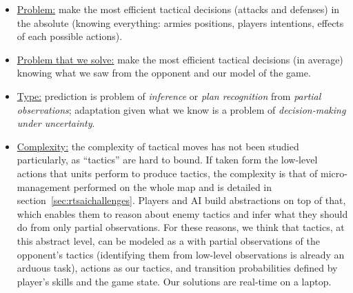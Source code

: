 \begin{itemize}
\item \underline{Problem:} make the most efficient tactical decisions (attacks and defenses) in the absolute (knowing everything: armies positions, players intentions, effects of each possible actions).
\item \underline{Problem that we solve:} make the most efficient tactical decisions (in average) knowing what we saw from the opponent and our model of the game. 
\item \underline{Type:} prediction is problem of \textit{inference} or \textit{plan recognition} from \textit{partial observations}; adaptation given what we know is a problem of \textit{decision-making under uncertainty}. 
\item \underline{Complexity:} the complexity of tactical moves has not been studied particularly, as ``tactics'' are hard to bound. If taken form the low-level actions that units perform to produce tactics, the complexity is that of micro-management performed on the whole map and is detailed in section~\ref{sec:rtsaichallenges}. Players and AI build abstractions on top of that, which enables them to reason about enemy tactics and infer what they should do from only partial observations. For these reasons, we think that tactics, at this abstract level, can be modeled as a  with partial observations of the opponent's tactics (identifying them from low-level observations is already an arduous task), actions as our tactics, and transition probabilities defined by player's skills and the game state. %
Our solutions are real-time on a laptop.
\end{itemize}

